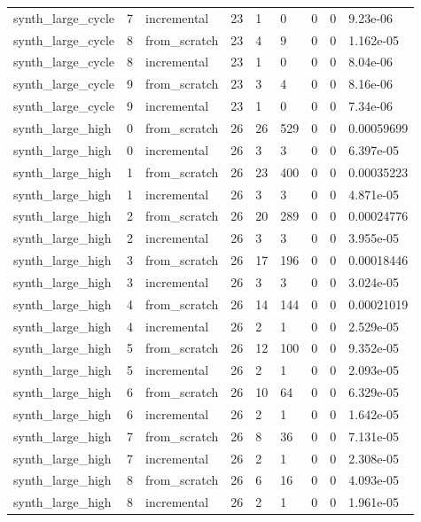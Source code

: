 \begin{table}[t]
\begin{tabular}{lllllllll}
synth\_large\_cycle & 7 & incremental & 23 & 1 & 0 & 0 & 0 & 9.23e-06 \\
synth\_large\_cycle & 8 & from\_scratch & 23 & 4 & 9 & 0 & 0 & 1.162e-05 \\
synth\_large\_cycle & 8 & incremental & 23 & 1 & 0 & 0 & 0 & 8.04e-06 \\
synth\_large\_cycle & 9 & from\_scratch & 23 & 3 & 4 & 0 & 0 & 8.16e-06 \\
synth\_large\_cycle & 9 & incremental & 23 & 1 & 0 & 0 & 0 & 7.34e-06 \\
synth\_large\_high & 0 & from\_scratch & 26 & 26 & 529 & 0 & 0 & 0.00059699 \\
synth\_large\_high & 0 & incremental & 26 & 3 & 3 & 0 & 0 & 6.397e-05 \\
synth\_large\_high & 1 & from\_scratch & 26 & 23 & 400 & 0 & 0 & 0.00035223 \\
synth\_large\_high & 1 & incremental & 26 & 3 & 3 & 0 & 0 & 4.871e-05 \\
synth\_large\_high & 2 & from\_scratch & 26 & 20 & 289 & 0 & 0 & 0.00024776 \\
synth\_large\_high & 2 & incremental & 26 & 3 & 3 & 0 & 0 & 3.955e-05 \\
synth\_large\_high & 3 & from\_scratch & 26 & 17 & 196 & 0 & 0 & 0.00018446 \\
synth\_large\_high & 3 & incremental & 26 & 3 & 3 & 0 & 0 & 3.024e-05 \\
synth\_large\_high & 4 & from\_scratch & 26 & 14 & 144 & 0 & 0 & 0.00021019 \\
synth\_large\_high & 4 & incremental & 26 & 2 & 1 & 0 & 0 & 2.529e-05 \\
synth\_large\_high & 5 & from\_scratch & 26 & 12 & 100 & 0 & 0 & 9.352e-05 \\
synth\_large\_high & 5 & incremental & 26 & 2 & 1 & 0 & 0 & 2.093e-05 \\
synth\_large\_high & 6 & from\_scratch & 26 & 10 & 64 & 0 & 0 & 6.329e-05 \\
synth\_large\_high & 6 & incremental & 26 & 2 & 1 & 0 & 0 & 1.642e-05 \\
synth\_large\_high & 7 & from\_scratch & 26 & 8 & 36 & 0 & 0 & 7.131e-05 \\
synth\_large\_high & 7 & incremental & 26 & 2 & 1 & 0 & 0 & 2.308e-05 \\
synth\_large\_high & 8 & from\_scratch & 26 & 6 & 16 & 0 & 0 & 4.093e-05 \\
synth\_large\_high & 8 & incremental & 26 & 2 & 1 & 0 & 0 & 1.961e-05 \\

\end{tabular}
\end{table}
